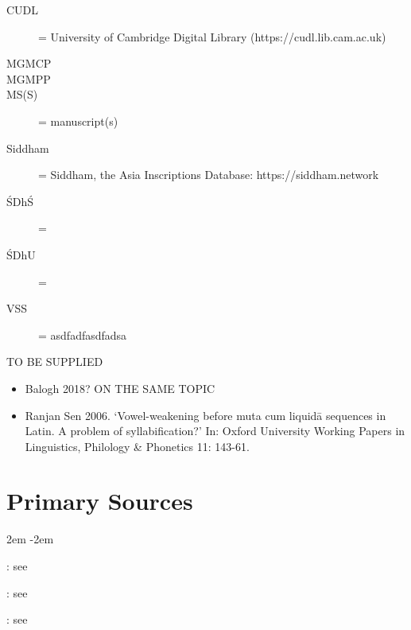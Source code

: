 \documentclass[12pt]{book}
\begin{document}
\begin{description}

\item[CUDL] = University of Cambridge Digital Library  
  (https://cudl.lib.cam.ac.uk)
  
\item[\fol]

\item[\fols]

\item[MGMCP]

\item[MGMPP]

\item[MS(S)] = manuscript(s)

\item[Siddham] = Siddham, the Asia Inscriptions Database:
https://siddham.network 

\item[ŚDhŚ] = \SDhS

\item[ŚDhU] = \SDhU
  
\item[VSS] = asdfadfasdfadsa
  
\end{description}


TO BE SUPPLIED

\begin{itemize}
\item
  Balogh 2018? ON THE SAME TOPIC
\item
  Ranjan Sen 2006. `Vowel-weakening before muta cum liquidā sequences in
  Latin. A problem of syllabification?' In: Oxford University Working
  Papers in Linguistics, Philology \& Phonetics 11: 143-61.
\end{itemize}
\vfill
\pagebreak



\section{Primary Sources}

\leftskip2em
\parindent-2em
\ 

: see 

: see \verify

: see \verify
\end{document}

